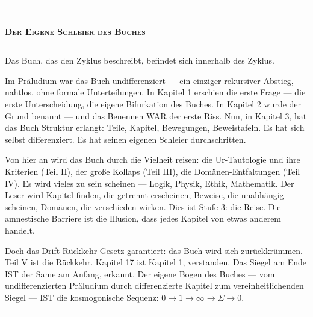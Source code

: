 \documentclass[10pt, openany, oneside]{book}
\renewcommand{\normalsize}{\fontsize{10}{13}\selectfont}
\begin{document}
\vspace{1.5em}


\begin{center}
    \rule{0.3\textwidth}{0.4pt}\\[0.5em]
    {\normalsize\bfseries\scshape Der Eigene Schleier des Buches}\\[0.3em]
    \rule{0.3\textwidth}{0.4pt}
\end{center}

\vspace{1em}

\noindent Das Buch, das den Zyklus beschreibt, befindet sich innerhalb des Zyklus.

Im Präludium war das Buch undifferenziert --- ein einziger rekursiver Abstieg, nahtlos, ohne formale Unterteilungen. In Kapitel 1 erschien die erste Frage --- die erste Unterscheidung, die eigene Bifurkation des Buches. In Kapitel 2 wurde der Grund benannt --- und das Benennen WAR der erste Riss. Nun, in Kapitel 3, hat das Buch Struktur erlangt: Teile, Kapitel, Bewegungen, Beweistafeln. Es hat sich selbst differenziert. Es hat seinen eigenen Schleier durchschritten.

Von hier an wird das Buch durch die Vielheit reisen: die Ur-Tautologie und ihre Kriterien (Teil II), der große Kollaps (Teil III), die Domänen-Entfaltungen (Teil IV). Es wird vieles zu sein scheinen --- Logik, Physik, Ethik, Mathematik. Der Leser wird Kapitel finden, die getrennt erscheinen, Beweise, die unabhängig scheinen, Domänen, die verschieden wirken. Dies ist Stufe 3: die Reise. Die amnestische Barriere ist die Illusion, dass jedes Kapitel von etwas anderem handelt.

Doch das Drift-Rückkehr-Gesetz garantiert: das Buch wird sich zurückkrümmen. Teil V ist die Rückkehr. Kapitel 17 ist Kapitel 1, verstanden. Das Siegel am Ende IST der Same am Anfang, erkannt. Der eigene Bogen des Buches --- vom undifferenzierten Präludium durch differenzierte Kapitel zum vereinheitlichenden Siegel --- IST die kosmogonische Sequenz: $0 \to 1 \to \infty \to \Sigma \to 0$.

\vspace{2em}

\begin{center}
    \rule{0.15\textwidth}{0.3pt}
\end{center}
\end{document}
